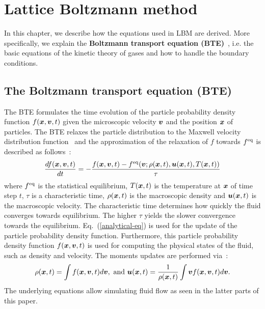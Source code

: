 \chapter{Lattice Boltzmann method}
\vspace{-8mm}
In this chapter, we describe how the equations used in LBM
are derived.
More specifically, we explain
the {\bf Boltzmann transport equation (BTE)}~\cite{mcnamara1988use}, i.e.
the basic equations of the kinetic theory of gases and
how to handle the boundary conditions.

\section{The Boltzmann transport equation (BTE)}
The BTE formulates the time evolution of the 
particle probability density function $f(\boldsymbol{x}, \boldsymbol{v}, t)$ given
the microscopic velocity $\boldsymbol{v}$ and the position $\boldsymbol{x}$ of particles.
The BTE relaxes the particle distribution to
the Maxwell velocity distribution
function~\cite{huang1963statistical} and the approximation of the relaxation of
$f$ towards $f^{\rm eq}$ is described as follows~\cite{bhatnagar1954model}:
\begin{equation}
  \begin{aligned}
    \frac{d f(\boldsymbol{x}, \boldsymbol{v}, t)}{d t} &= 
    - \frac{
      f(\boldsymbol{x}, \boldsymbol{v}, t) - f^{\rm eq}(\boldsymbol{v}; \rho(\boldsymbol{x}, t), \boldsymbol{u}(\boldsymbol{x}, t), T(\boldsymbol{x}, t))
      }{\tau} \\
    \end{aligned}
    \label{analytical-eq}
  \end{equation}
where $f^{\rm eq}$ is the statistical equilibrium,
$T(\boldsymbol{x}, t)$ is the temperature at $\boldsymbol{x}$
of time step $t$,
$\tau$ is a characteristic time, $\rho(\boldsymbol{x}, t)$ is the macroscopic density
and $\boldsymbol{u}(\boldsymbol{x}, t)$ is the macroscopic velocity.
The characteristic time determines how quickly
the fluid converges towards equilibrium.
The higher $\tau$ yields the slower 
convergence towards the equilibrium.
Eq.~(\ref{analytical-eq}) is used for the update 
of the particle probability density function.
Furthermore, this particle probability density function
$f(\boldsymbol{x}, \boldsymbol{v}, t)$ is used for computing
the physical states of the fluid,
such as density and velocity.
The moments updates are performed via~\cite{caroli1984non}:
\begin{equation}
  \begin{aligned}
    \rho(\boldsymbol{x}, t) = \int f(\boldsymbol{x}, \boldsymbol{v}, t) d\boldsymbol{v},  \text{ and }
    \boldsymbol{u}(\boldsymbol{x}, t) = \frac{1}{\rho(\boldsymbol{x}, t)} \int \boldsymbol{v} f(\boldsymbol{x}, \boldsymbol{v}, t)  d\boldsymbol{v}. 
  \end{aligned}
  \label{analytical-update}
\end{equation}
The underlying equations allow simulating
fluid flow as seen in the latter parts of this paper.

